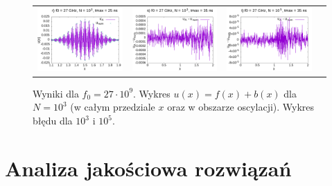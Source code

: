 \documentclass[11pt,a4paper]{report}
\begin{document}
\begin{figure}
\begin{tabular}{cccc}
\includegraphics[width=45mm]{plots/27/closeup/mc27_3_35} &    \includegraphics[width=45mm]{plots/27/mc27_3_35_dif} &   \includegraphics[width=45mm]{plots/27/mc27_5_35_dif} \\
\end{tabular}
\caption{Wyniki dla $f_0 = 27 \cdot 10^9$. Wykres $u(x) = f(x)+b(x)$ dla $N = 10^3$ (w całym przedziale $x$ oraz w obszarze oscylacji). Wykres błędu dla $10^3$ i $10^5$.}
\end{figure}
\newpage

\chapter{Analiza jakościowa rozwiązań}
\end{document}
